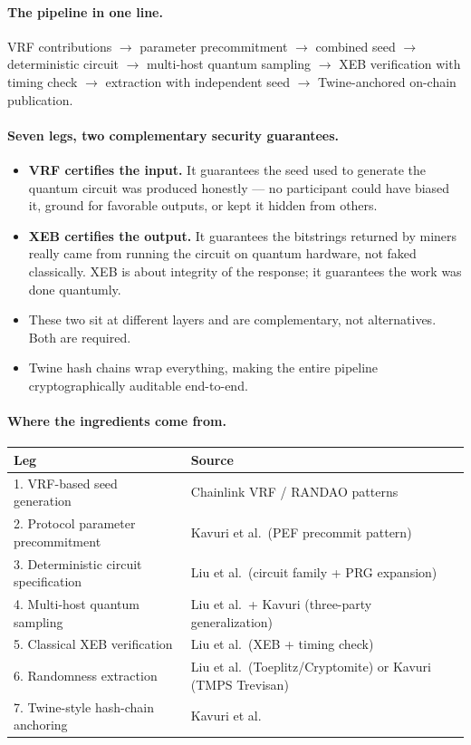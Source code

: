 \documentclass[11pt]{article}
\begin{document}
\paragraph{The pipeline in one line.} VRF contributions $\to$ parameter precommitment $\to$ combined seed $\to$ deterministic circuit $\to$ multi-host quantum sampling $\to$ XEB verification with timing check $\to$ extraction with independent seed $\to$ Twine-anchored on-chain publication.

\paragraph{Seven legs, two complementary security guarantees.}

\begin{itemize}
    \item \textbf{VRF certifies the input.} It guarantees the seed used to generate the quantum circuit was produced honestly --- no participant could have biased it, ground for favorable outputs, or kept it hidden from others.
    \item \textbf{XEB certifies the output.} It guarantees the bitstrings returned by miners really came from running the circuit on quantum hardware, not faked classically. XEB is about integrity of the response; it guarantees the work was done quantumly.
    \item These two sit at different layers and are complementary, not alternatives. Both are required.
    \item Twine hash chains wrap everything, making the entire pipeline cryptographically auditable end-to-end.
\end{itemize}

\paragraph{Where the ingredients come from.}

\begin{center}
\begin{tabular}{ll}
\toprule
\textbf{Leg} & \textbf{Source} \\
\midrule
1. VRF-based seed generation & Chainlink VRF / RANDAO patterns \\
2. Protocol parameter precommitment & Kavuri et al.\ (PEF precommit pattern) \\
3. Deterministic circuit specification & Liu et al.\ (circuit family + PRG expansion) \\
4. Multi-host quantum sampling & Liu et al.\ + Kavuri (three-party generalization) \\
5. Classical XEB verification & Liu et al.\ (XEB + timing check) \\
6. Randomness extraction & Liu et al.\ (Toeplitz/Cryptomite) or Kavuri (TMPS Trevisan) \\
7. Twine-style hash-chain anchoring & Kavuri et al.\ \\
\bottomrule
\end{tabular}
\end{center}
\end{document}
